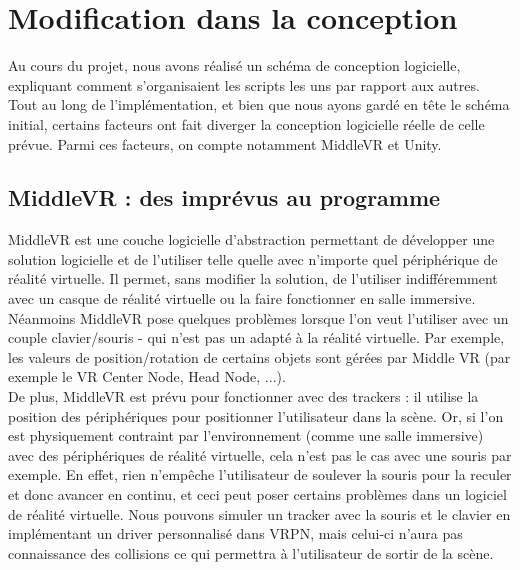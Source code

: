 \section{Modification dans la conception}

Au cours du projet, nous avons réalisé un schéma de conception logicielle, expliquant comment s'organisaient les scripts les uns par rapport aux autres.
Tout au long de l'implémentation, et bien que nous ayons gardé  en tête le schéma initial, certains facteurs ont fait diverger la conception logicielle réelle de celle prévue.
Parmi ces facteurs, on compte notamment MiddleVR et Unity.

\subsection{MiddleVR : des imprévus au programme}

MiddleVR est une couche logicielle d'abstraction permettant de développer une solution logicielle et de l'utiliser telle quelle avec n'importe quel périphérique de réalité virtuelle.
Il permet, sans modifier la solution, de l'utiliser indifféremment avec un casque de réalité virtuelle ou la faire fonctionner en salle immersive.
Néanmoins MiddleVR pose quelques problèmes lorsque l'on veut l'utiliser avec un couple clavier/souris - qui n'est pas un adapté à la réalité virtuelle.
Par exemple, les valeurs de position/rotation de certains objets sont gérées par Middle VR (par exemple le VR Center Node, Head Node, ...). \\
De plus, MiddleVR est prévu pour fonctionner avec des trackers : il utilise la position des périphériques pour positionner l'utilisateur dans la scène.
Or, si l'on est physiquement contraint par l'environnement (comme une salle immersive) avec des périphériques de réalité virtuelle, cela n'est pas le cas avec une souris par exemple.
En effet, rien n'empêche l'utilisateur de soulever la souris pour la reculer et donc avancer en continu, et ceci peut poser certains problèmes dans un logiciel de réalité virtuelle.
Nous pouvons simuler un tracker avec la souris et le clavier en implémentant un driver personnalisé dans VRPN, mais celui-ci n'aura pas connaissance des collisions ce qui permettra à l'utilisateur de sortir de la scène.

